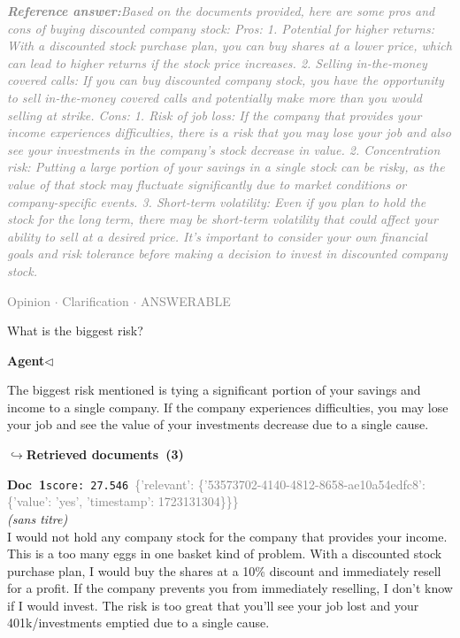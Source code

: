 \documentclass[a4paper,11pt]{article}
\begin{document}
\begin{refanswerenv}
{\footnotesize\textit{\textcolor{gray}{\textbf{Reference answer:}\enspace Based on the documents provided, here are some pros and cons of buying discounted company stock:
Pros:
1. Potential for higher returns: With a discounted stock purchase plan, you can buy shares at a lower price, which can lead to higher returns if the stock price increases.
2. Selling in-the-money covered calls: If you can buy discounted company stock, you have the opportunity to sell in-the-money covered calls and potentially make more than you would selling at strike.
Cons:
1. Risk of job loss: If the company that provides your income experiences difficulties, there is a risk that you may lose your job and also see your investments in the company's stock decrease in value.
2. Concentration risk: Putting a large portion of your savings in a single stock can be risky, as the value of that stock may fluctuate significantly due to market conditions or company-specific events.
3. Short-term volatility: Even if you plan to hold the stock for the long term, there may be short-term volatility that could affect your ability to sell at a desired price.
It's important to consider your own financial goals and risk tolerance before making a decision to invest in discounted company stock.}}}
\end{refanswerenv}
\vspace{0.5em}
\hfill{\tiny\textcolor{gray}{Opinion $\cdot$ Clarification $\cdot$ ANSWERABLE}}
\begin{userbubble}
What is the biggest risk?
\end{userbubble}
\noindent\hfill{\small\textcolor{agentcolor}{\textbf{Agent\enspace$\triangleleft$}}}
\begin{agentbubble}
The biggest risk mentioned is tying a significant portion of your savings and income to a single company. If the company experiences difficulties, you may lose your job and see the value of your investments decrease due to a single cause.
\end{agentbubble}
\noindent\hfill{\footnotesize\textcolor{doccolor}{\textbf{$\hookrightarrow$\enspace Retrieved documents~(3)}}}
\begin{docenv}
{\footnotesize\textcolor{doccolor}{\textbf{Doc~1}}}\hfill{\tiny\texttt{score:~27.546}}\ {\tiny\textcolor{gray}{\{'relevant': \{'53573702-4140-4812-8658-ae10a54edfc8': \{'value': 'yes', 'timestamp': 1723131304\}\}\}}}\\[3pt]
{\small\textit{(sans titre)}}\\[2pt]
\vspace{2pt}
{\footnotesize 
I would not hold any company stock for the company that provides your income.   This is a too many eggs in one basket kind of problem. With a discounted stock purchase plan, I would buy the shares at a 10\% discount and immediately resell for a profit.   If the company prevents you from immediately reselling, I  don't know if I would invest. The risk is too great that you'll see your job lost and your 401k/investments emptied due to a single cause.}
\end{docenv}
\end{document}
